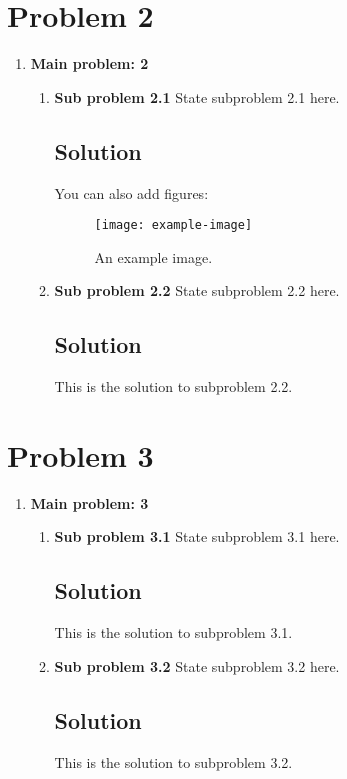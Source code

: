\documentclass[12pt]{article}
\begin{document}
\section*{Problem 2}
\begin{enumerate}
    \item \textbf{Main problem: 2}
    \begin{enumerate}
        \item \textbf{Sub problem 2.1}
        State subproblem 2.1 here.
        
        \subsection*{Solution}
        You can also add figures:
        \begin{figure}[h!]
            \centering
            \texttt{[image: example-image]}
            \caption{An example image.}
            \label{fig:example}
        \end{figure}
        
        \item \textbf{Sub problem 2.2}
        State subproblem 2.2 here.
        
        \subsection*{Solution}
        This is the solution to subproblem 2.2.
    \end{enumerate}
\end{enumerate}

\section*{Problem 3}
\begin{enumerate}
    \item \textbf{Main problem: 3}
    \begin{enumerate}
        \item \textbf{Sub problem 3.1}
        State subproblem 3.1 here.
        
        \subsection*{Solution}
        This is the solution to subproblem 3.1.
        
        \item \textbf{Sub problem 3.2}
        State subproblem 3.2 here.
        
        \subsection*{Solution}
        This is the solution to subproblem 3.2.
    \end{enumerate}
\end{enumerate}
\end{document}
